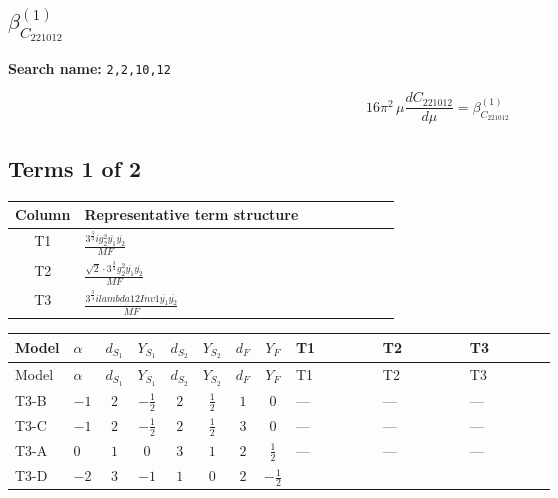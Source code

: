 \documentclass[8pt]{article}
\begin{document}
\begin{landscape}
\section*{$\beta_{C_{221012}}^{(1)}$}
\noindent\textbf{Search name: }\texttt{2,2,10,12}\par\smallskip
\[16\pi^2\,\mu\frac{d C_{221012}}{d\mu}=\beta_{C_{221012}}^{(1)}\]
\subsection*{Terms 1 of 2}
\begin{center}
\begin{tabular}{@{}c >{\raggedright\arraybackslash}p{0.82\linewidth}@{}}
\toprule
Column & Representative term structure \\
\midrule
T1 & \(\displaystyle \frac{3^{\frac{3}{4}} i g_{2}^{2} \overline{y_{1}} \overline{y_{2}}}{MF}\) \\
\midrule
T2 & \(\displaystyle \frac{\sqrt{2} \cdot 3^{\frac{3}{4}} g_{2}^{2} \overline{y_{1}} \overline{y_{2}}}{MF}\) \\
\midrule
T3 & \(\displaystyle \frac{3^{\frac{3}{4}} i lambda12Inv1 \overline{y_{1}} \overline{y_{2}}}{MF}\) \\
\midrule
\bottomrule
\end{tabular}
\end{center}
\smallskip
\tiny
\begin{longtable}{@{}llcccccc >{\raggedright\arraybackslash}p{0.21\linewidth} >{\raggedright\arraybackslash}p{0.21\linewidth} >{\raggedright\arraybackslash}p{0.21\linewidth}@{}}
\toprule
Model & $\alpha$ & $d_{S_1}$ & $Y_{S_1}$ & $d_{S_2}$ & $Y_{S_2}$ & $d_F$ & $Y_F$ & T1 & T2 & T3 \\
\midrule
\endfirsthead
\toprule
Model & $\alpha$ & $d_{S_1}$ & $Y_{S_1}$ & $d_{S_2}$ & $Y_{S_2}$ & $d_F$ & $Y_F$ & T1 & T2 & T3 \\
\midrule
\endhead
T3-B & $-1$ & $2$ & $-\frac{1}{2}$ & $2$ & $\frac{1}{2}$ & $1$ & $0$ & --- & --- & --- \\
\midrule
T3-C & $-1$ & $2$ & $-\frac{1}{2}$ & $2$ & $\frac{1}{2}$ & $3$ & $0$ & --- & --- & --- \\
\midrule
T3-A & $0$ & $1$ & $0$ & $3$ & $1$ & $2$ & $\frac{1}{2}$ & --- & --- & --- \\
\midrule
T3-D & $-2$ & $3$ & $-1$ & $1$ & $0$ & $2$ & $-\frac{1}{2}$ & \scriptsize\adjustbox{max width=\linewidth}{$\begin{gathered} - \frac{17 \cdot 3^{\frac{3}{4}} i g_{2}^{2} \overline{y_{1}} \overline{y_{2}}}{24 MF}\end{gathered}$} & \scriptsize\adjustbox{max width=\linewidth}{$\begin{gathered} - \frac{\sqrt{2} \cdot 3^{\frac{3}{4}} g_{2}^{2} \overline{y_{1}} \overline{y_{2}}}{3 MF}\end{gathered}$} & \scriptsize\adjustbox{max width=\linewidth}{$\begin{gathered} - \frac{3^{\frac{3}{4}} i lambda12Inv1 \overline{y_{1}} \overline{y_{2}}}{6 MF}\end{gathered}$} \\

\end{longtable}
\end{landscape}
\end{document}
